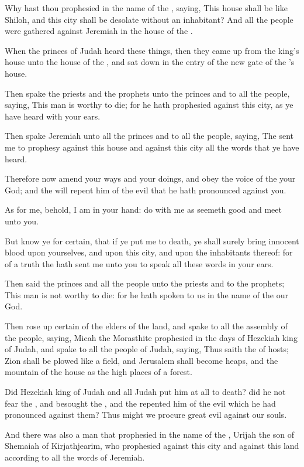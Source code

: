\verse Why hast thou prophesied in the name of the \LORD, saying, This house shall be like Shiloh, and this city shall be desolate without an inhabitant?  And all the people were gathered against Jeremiah in the house of the \LORD.

\verse When the princes of Judah heard these things, then they came up from the king's house unto the house of the \LORD, and sat down in the entry of the new gate of the \LORD's house.

\verse Then spake the priests and the prophets unto the princes and to all the people, saying, This man is worthy to die; for he hath prophesied against this city, as ye have heard with your ears.

\verse Then spake Jeremiah unto all the princes and to all the people, saying, The \LORD sent me to prophesy against this house and against this city all the words that ye have heard.

\verse Therefore now amend your ways and your doings, and obey the voice of the \LORD your God; and the \LORD will repent him of the evil that he hath pronounced against you.

\verse As for me, behold, I am in your hand: do with me as seemeth good and meet unto you.

\verse But know ye for certain, that if ye put me to death, ye shall surely bring innocent blood upon yourselves, and upon this city, and upon the inhabitants thereof: for of a truth the \LORD hath sent me unto you to speak all these words in your ears.

\verse Then said the princes and all the people unto the priests and to the prophets; This man is not worthy to die: for he hath spoken to us in the name of the \LORD our God.

\verse Then rose up certain of the elders of the land, and spake to all the assembly of the people, saying, \verse Micah the Morasthite prophesied in the days of Hezekiah king of Judah, and spake to all the people of Judah, saying, Thus saith the \LORD of hosts; Zion shall be plowed like a field, and Jerusalem shall become heaps, and the mountain of the house as the high places of a forest.

\verse Did Hezekiah king of Judah and all Judah put him at all to death?  did he not fear the \LORD, and besought the \LORD, and the \LORD repented him of the evil which he had pronounced against them? Thus might we procure great evil against our souls.

\verse And there was also a man that prophesied in the name of the \LORD, Urijah the son of Shemaiah of Kirjathjearim, who prophesied against this city and against this land according to all the words of Jeremiah.

